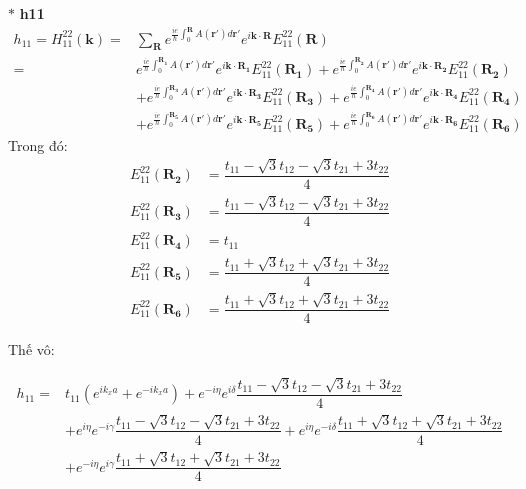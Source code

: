 \documentclass{report}
\begin{document}
\noindent$\ast$ \textbf{h11}
\begin{align*}
	h_{11} = H_{11}^{22}(\textbf{k})  = & \sum_{\textbf{R}} e^{\frac{ie}{\hbar}\int_{0}^{\mathbf{R}}A(\mathbf{r'})d\mathbf{r'}}e^{i\mathbf{k\cdot R}} E_{11}^{22}(\mathbf{R})                                                                                                                 \\
	=                                   & e^{\frac{ie}{\hbar}\int_{0}^{\mathbf{R_1}}A(\mathbf{r'})d\mathbf{r'}}e^{i\mathbf{k\cdot R_1}} E_{11}^{22}(\mathbf{R_1}) + e^{\frac{ie}{\hbar}\int_{0}^{\mathbf{R_2}}A(\mathbf{r'})d\mathbf{r'}}e^{i\mathbf{k\cdot R_2}} E_{11}^{22}(\mathbf{R_2})   \\
	                                    & + e^{\frac{ie}{\hbar}\int_{0}^{\mathbf{R_3}}A(\mathbf{r'})d\mathbf{r'}}e^{i\mathbf{k\cdot R_3}} E_{11}^{22}(\mathbf{R_3}) + e^{\frac{ie}{\hbar}\int_{0}^{\mathbf{R_4}}A(\mathbf{r'})d\mathbf{r'}}e^{i\mathbf{k\cdot R_4}} E_{11}^{22}(\mathbf{R_4}) \\
	                                    & + e^{\frac{ie}{\hbar}\int_{0}^{\mathbf{R_5}}A(\mathbf{r'})d\mathbf{r'}}e^{i\mathbf{k\cdot R_5}} E_{11}^{22}(\mathbf{R_5}) + e^{\frac{ie}{\hbar}\int_{0}^{\mathbf{R_6}}A(\mathbf{r'})d\mathbf{r'}}e^{i\mathbf{k\cdot R_6}} E_{11}^{22}(\mathbf{R_6})
\end{align*}
Trong đó:
\begin{align*}
	E_{11}^{22}(\mathbf{R_2}) & = \dfrac{t_{11} - \sqrt{3}t_{12} - \sqrt{3}t_{21} + 3t_{22}}{4}  \\
	E_{11}^{22}(\mathbf{R_3}) & = \dfrac{t_{11} - \sqrt{3}t_{12} - \sqrt{3}t_{21} + 3t_{22}}{4}  \\
	E_{11}^{22}(\mathbf{R_4}) & = t_{11}                                                         \\
	E_{11}^{22}(\mathbf{R_5}) & =  \dfrac{t_{11} + \sqrt{3}t_{12} + \sqrt{3}t_{21} + 3t_{22}}{4} \\
	E_{11}^{22}(\mathbf{R_6}) & =  \dfrac{t_{11} + \sqrt{3}t_{12} + \sqrt{3}t_{21} + 3t_{22}}{4}
\end{align*}

Thế vô:

\begin{align*}
	h_{11} = & t_{11}\left( e^{ik_x a} + e^{-ik_x a} \right) + e^{-i\eta}e^{i\delta} \dfrac{t_{11} - \sqrt{3}t_{12} - \sqrt{3}t_{21} + 3t_{22}}{4}                                           \\
	         & + e^{i\eta} e^{-i\gamma} \dfrac{t_{11} - \sqrt{3}t_{12} - \sqrt{3}t_{21} + 3t_{22}}{4} + e^{i\eta} e^{-i\delta} \dfrac{t_{11} + \sqrt{3}t_{12} + \sqrt{3}t_{21} + 3t_{22}}{4} \\
	         & + e^{-i\eta} e^{i\gamma} \dfrac{t_{11} + \sqrt{3}t_{12} + \sqrt{3}t_{21} + 3t_{22}}{4}
\end{align*}
\end{document}
